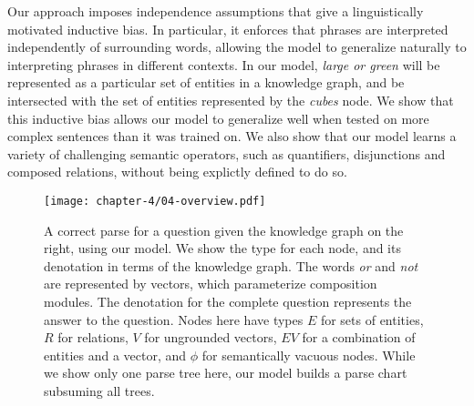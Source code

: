 \documentclass[main.tex]{subfiles}
\begin{document}
Our approach imposes independence assumptions that give a linguistically motivated inductive bias. In particular, it enforces that phrases are interpreted independently of surrounding words, allowing the model to generalize naturally to interpreting phrases in different contexts. In our model, \emph{large or green} will be represented as a particular set of entities in a knowledge graph, and be intersected with the set of entities represented by the \emph{cubes} node.  We show that this inductive bias allows our model to generalize well when tested on more complex sentences than it was trained on.  We also show that our model learns a variety of challenging semantic operators, such as quantifiers, disjunctions and composed relations, without being explictly defined to do so.



\begin{figure}[tb]
    \centering
    \texttt{[image: chapter-4/04-overview.pdf]}
    \caption{{ A correct parse for a question given the knowledge graph on the right, using our model. We show the type for each node, and its denotation in terms of the knowledge graph. The words \emph{or} and \emph{not} are represented by vectors, which parameterize composition modules. The denotation for the complete question represents the answer to the question.
    Nodes here have types $E$ for sets of entities, $R$ for relations, $V$ for ungrounded vectors, $EV$ for a combination of entities and a vector, and $\phi$ for semantically vacuous nodes.
    While we show only one parse tree here, our model builds a parse chart subsuming all trees.} }
    \label{fig:04-overview}
\end{figure}
\end{document}
